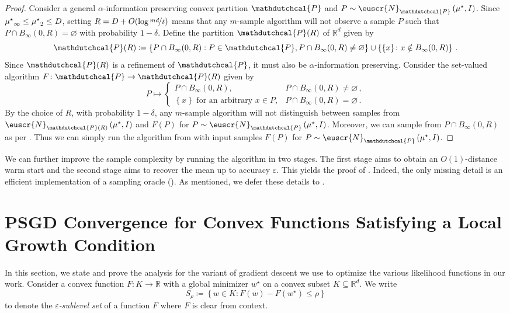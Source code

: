 \documentclass[11pt,letterpaper]{article}
\DeclarePairedDelimiter{\set}{\{}{\}}
\newcommand{\sset}{\subseteq}
\theoremstyle{plain}
\theoremstyle{definition}
\theoremstyle{remark}
\newcommand{\inbrace}[1]{\ensuremath{\left\{#1\right\}}}
\newcommand{\inparen}[1]{\ensuremath{\left(#1\right)}}
\let\norm\relax
\newcommand{\norm}[1]{\ensuremath{\left\lVert #1 \right\rVert}}
\newcommand{\R}{\mathbb{R}}
\newcommand{\nfrac}[2]{\nicefrac{#1}{#2}}
\newcommand{\eps}{\varepsilon}
\newcommand{\customcal}[1]{\euscr{#1}}
\newcommand{\cN}{\customcal{N}}
\newcommand{\hypo}[1]{\mathdutchcal{#1}}
\newcommand{\hyP}{\hypo{P}}
\newcommand{\coarseNormal}[3]{\cN_{#3}\inparen{#1,#2}}
\newcommand{\muStar}{{\mu^\star}}
\begin{document}
{{{\begin{proof}
    Consider a general $\alpha$-information preserving convex partition $\hyP$ and $P\sim \coarseNormal{\muStar}{I}{\hyP}$.
    Since $\norm{\muStar}_\infty\leq \norm{\muStar}_2\leq D$,
    setting $R = D + O(\log\nfrac{md}{\delta})$ means that any $m$-sample algorithm will not observe 
    a sample $P$ such that $P\cap B_\infty(0, R) = \varnothing$ with probability $1-\delta$.
    Define the partition $\hyP(R)$ of $\R^d$ given by
    \[
        \hyP(R)\coloneqq 
        \inbrace{P\cap B_\infty(0, R): P\in \hyP, P\cap B_\infty(0, R)\neq \varnothing}
        \cup \inbrace{\set{x}\colon x\notin B_\infty(0, R)}\,.
    \]
    Since $\hyP(R)$ is a refinement of $\hyP$,
    it must also be $\alpha$-information preserving.
    Consider the set-valued algorithm $F\colon  \hyP\to \hyP(R)$ given  by
    \[
        P \mapsto 
        \begin{cases}
            P\cap B_\infty(0, R), &P\cap B_\infty(0, R)\neq \varnothing\,, \\
            \text{$\inbrace{x}$ for an arbitrary $x\in P$}, &P\cap B_\infty(0, R) = \varnothing\,.
        \end{cases}
    \]
    By the choice of $R$,
    with probability $1-\delta$,
    any $m$-sample algorithm will not distinguish between 
    samples from $\coarseNormal{\muStar}{I}{\hyP(R)}$ and $F(P)$ for $P\sim \coarseNormal{\muStar}{I}{\hyP}$.
    Moreover,
    we can sample from $P\cap B_\infty(0, R)$ as per .
    Thus we can simply run the algorithm from 
    with input samples $F(P)$ for $P\sim \coarseNormal{\muStar}{I}{\hyP}$.
\end{proof}
We can further improve the sample complexity by running the algorithm in two stages.
The first stage aims to obtain an $O(1)$-distance warm start
and the second stage aims to recover the mean up to accuracy $\eps$.
This yields the proof of .
Indeed,
the only missing detail is an efficient implementation of a sampling oracle ().
As mentioned,
we defer these details to .

    






 
\section{PSGD Convergence for Convex Functions Satisfying a Local Growth Condition}
\label{sec:sgd-analysis}
In this section,
we state and prove the analysis for the variant of gradient descent we use to optimize the various likelihood functions in our work.
Consider a convex function $F\colon  K\to \R$ with a global minimizer $w^\star$
on a convex subset $K\sset \R^d$.
We write
\[
    S_\rho \coloneqq \inbrace{w\in K\colon F(w) - F(w^\star)\leq \rho}
\]
to denote the \emph{$\eps$-sublevel set} of a function $F$
where $F$ is clear from context.

}}}
\end{document}
